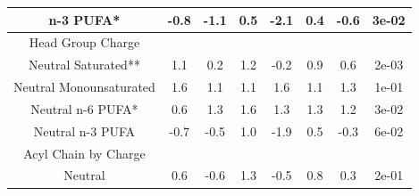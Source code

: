 \documentclass[9pt]{article}
\begin{document}
\begin{table}
{\begin{tabular}{| c || ccccc | cc|}
n-3 PUFA*     &              -0.8 &              -1.1 &                0.5 &               -2.1 &                0.4 & -0.6 &  3e-02 \\
\hline
Head Group Charge &&&&&&&\\
Neutral Saturated**    &               1.1 &               0.2 &                1.2 &               -0.2 &                0.9 &  0.6 &  2e-03 \\
Neutral Monounsaturated    &               1.6 &               1.1 &                1.1 &                1.6 &                1.1 &  1.3 &  1e-01 \\
Neutral n-6 PUFA*    &               0.6 &               1.3 &                1.6 &                1.3 &                1.3 &  1.2 &  3e-02 \\
Neutral n-3 PUFA    &              -0.7 &              -0.5 &                1.0 &               -1.9 &                0.5 & -0.3 &  6e-02 \\
Acyl Chain by Charge &&&&&&&\\
Neutral &               0.6 &              -0.6 &                1.3 &               -0.5 &                0.8 &  0.3 &  2e-01 \\

\hline
\end{tabular}}
\end{table}
\end{document}
